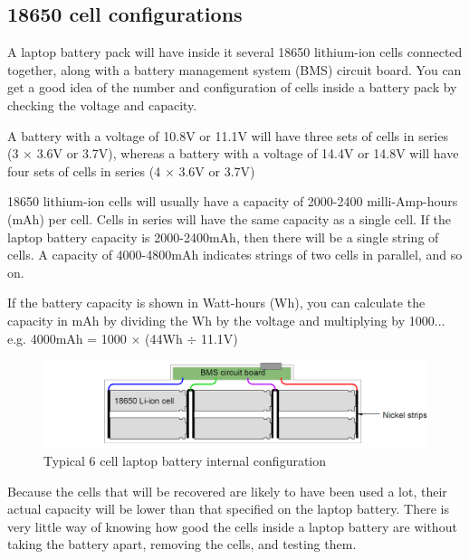 \documentclass{article}
\theoremstyle{definition}
\theoremstyle{definition}
\theoremstyle{remark}
\begin{document}

  \subsection{18650 cell configurations} %
  \label{sub:18650_cell_configurations}

    A laptop battery pack will have inside it several 18650 lithium-ion cells connected together, along with a battery management system (BMS) circuit board. You can get a good idea of the number and configuration of cells inside a battery pack by checking the voltage and capacity. 

    A battery with a voltage of 10.8V or 11.1V will have three sets of cells in series (3 \(\times\) 3.6V or 3.7V), whereas a battery with a voltage of 14.4V or 14.8V will have four sets of cells in series (4 \(\times\) 3.6V or 3.7V)

    18650 lithium-ion cells will usually have a capacity of 2000-2400 milli-Amp-hours (mAh) per cell. Cells in series will have the same capacity as a single cell. If the laptop battery capacity is 2000-2400mAh, then there will be a single string of cells. A capacity of 4000-4800mAh indicates strings of two cells in parallel, and so on.

    If the battery capacity is shown in Watt-hours (Wh), you can calculate the capacity in mAh by dividing the Wh by the voltage and multiplying by 1000... e.g. 4000mAh = 1000 \(\times\) (44Wh \(\div\) 11.1V)

    \begin{figure}[h!]
      \centering
      \includegraphics[width=0.75\paperwidth]{Images/image_5_2_(battery_configuration).png}
      \caption*{\centering Typical 6 cell laptop battery internal configuration}
    \end{figure}

    Because the cells that will be recovered are likely to have been used a lot, their actual capacity will be lower than that specified on the laptop battery. There is very little way of knowing how good the cells inside a laptop battery are without taking the battery apart, removing the cells, and testing them.
  
\end{document}
